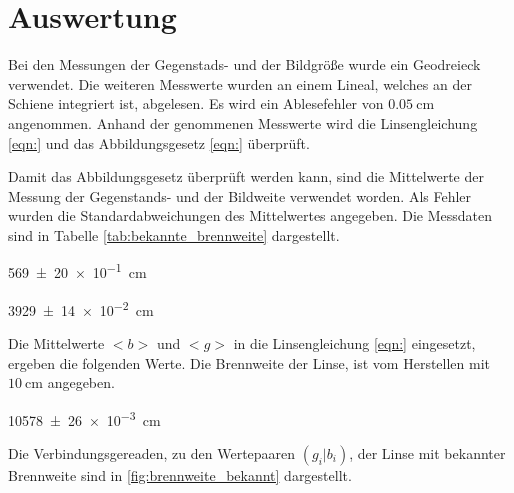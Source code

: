 



\section{Auswertung}

Bei den Messungen der Gegenstads- und der Bildgröße wurde ein Geodreieck verwendet.
Die weiteren Messwerte wurden an einem Lineal, welches an der Schiene integriert
ist, abgelesen. Es wird ein Ablesefehler von $\SI{0,05}{\centi\meter}$ angenommen.
Anhand der genommenen Messwerte wird die Linsengleichung \eqref{eqn:} und das
Abbildungsgesetz \eqref{eqn:} überprüft.

Damit das Abbildungsgesetz überprüft werden kann, sind die Mittelwerte der Messung
der Gegenstands- und der Bildweite verwendet worden. Als Fehler wurden die
Standardabweichungen des Mittelwertes angegeben.
Die Messdaten sind in Tabelle \ref{tab:bekannte_brennweite} dargestellt.

\begin{description}
  \centering
  \item[$\frac{B}{G}=$]\SI{569(20)e-1}{\centi\meter}
  \item[$\frac{<b>}{<g>}=$]\SI{3929(14)e-2}{\centi\meter}
\end{description}



Die Mittelwerte $<b>$ und $<g>$ in die Linsengleichung \eqref{eqn:} eingesetzt,
ergeben die folgenden
Werte. Die Brennweite der Linse, ist vom Herstellen mit $\SI{10}{\centi\meter}$
angegeben.

\begin{description}
  \centering
  \item[$<f_1>\ua{gemessen}=$]\SI{10578(26)e-3}{\centi\meter}
\end{description}

Die Verbindungsgereaden, zu den Wertepaaren $(g_i|b_i)$, der Linse mit bekannter
Brennweite sind in \ref{fig:brennweite_bekannt}
dargestellt.

